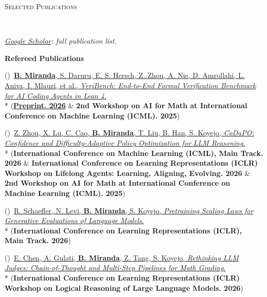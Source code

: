 \documentclass{article}
\newenvironment{changemargin}[2]{%
  \begin{list}{}{%
    \setlength{\topsep}{0pt}%
    \setlength{\leftmargin}{#1}%
    \setlength{\rightmargin}{#2}%
    \setlength{\listparindent}{\parindent}%
    \setlength{\itemindent}{\parindent}%
    \setlength{\parsep}{\parskip}%
  }%
  \item[]}{\end{list}
}
\newcommand{\lineover}{
	\begin{changemargin}{-0.05in}{-0.05in}
		\vspace*{-8pt}
		\hrulefill \\
		\vspace*{-2pt}
	\end{changemargin}
}
\newcommand{\header}[1]{
	\begin{changemargin}{-0.5in}{-0.5in}
		\scshape{#1}\\
  	\lineover
	\end{changemargin}
	\nopagebreak[4]    %
}
\newenvironment{body} {
		\vspace*{-16pt}
		\begin{changemargin}{-0.25in}{-0.5in}
	  }
		{\end{changemargin}\vspace{8pt plus 12pt}
	}
\newcounter{pubnum}
\newcommand{\pubitem}{\stepcounter{pubnum}(\thepubnum)~}
\begin{document}
\newpage
\header{Selected Publications}
\begin{body}
    \small
    \vspace{8pt} %

    \vspace{4pt}
    \emph{\href{https://scholar.google.com/citations?user=_NQJoBkAAAAJ&hl=en}{Google Scholar}: full publication list.}

    \vspace{8pt}
    \textbf{Refereed Publications}
    \par\nopagebreak[4]\vspace{4pt}
    \setcounter{pubnum}{0}

    \pubitem \href{https://cs.stanford.edu/people/brando9/veribench/blog/veribench-launch/}
    {\textbf{B. Miranda}, S. Daruru, E. S. Hersch, Z. Zhou, A. Nie, D. Amrollahi, L. Aniva, I. Mlauzi, et al.,
    \emph{VeriBench: End-to-End Formal Verification Benchmark for AI Coding Agents in Lean 4}.}
    \\*
    (\href{https://purl.stanford.edu/nw314gc8770}{\textbf{Preprint. 2026}} \& \textbf{2nd Workshop on AI for Math at International Conference on Machine Learning (ICML). 2025})

    \vspace{10pt}
    \pubitem \href{https://openreview.net/forum?id=8OoZ8dnvIT}
    {Z. Zhou, X. Lu, C. Cao, \textbf{B. Miranda}, T. Liu, B. Han, S. Koyejo,
    \emph{CoDaPO: Confidence and Difficulty-Adaptive Policy Optimization for LLM Reasoning}.}
    \\*
    (\textbf{International Conference on Machine Learning (ICML), Main Track. 2026} \& \textbf{International Conference on Learning Representations (ICLR) Workshop on Lifelong Agents: Learning, Aligning, Evolving. 2026} \& \textbf{2nd Workshop on AI for Math at International Conference on Machine Learning (ICML). 2025})

    \vspace{10pt}
    \pubitem \href{https://openreview.net/forum?id=Ym33xJYINV}
    {R. Schaeffer, N. Levi, \textbf{B. Miranda}, S. Koyejo,
    \emph{Pretraining Scaling Laws for Generative Evaluations of Language Models}.}
    \\*
    (\textbf{International Conference on Learning Representations (ICLR), Main Track. 2026})

    \vspace{10pt}
    \pubitem \href{https://openreview.net/forum?id=vdXPorr099}
    {E. Chen, A. Gulati, \textbf{B. Miranda}, Z. Tang, S. Koyejo,
    \emph{Rethinking LLM Judges: Chain-of-Thought and Multi-Step Pipelines for Math Grading}.}
    \\*
    (\textbf{International Conference on Learning Representations (ICLR) Workshop on Logical Reasoning of Large Language Models. 2026})


\end{body}
\end{document}
